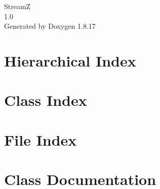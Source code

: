 \let\mypdfximage\pdfximage\def\pdfximage{\immediate\mypdfximage}\documentclass[twoside]{book}
\newcommand{\+}{\discretionary{\mbox{\scriptsize$\hookleftarrow$}}{}{}}
\newcommand{\clearemptydoublepage}{%
  \newpage{\pagestyle{empty}\cleardoublepage}%
}
\begin{document}
\hypersetup{pageanchor=false,
             bookmarksnumbered=true,
             pdfencoding=unicode
            }
\begin{titlepage}
\vspace*{7cm}
\begin{center}%
{\Large StreamZ \\[1ex]\large 1.\+0 }\\
\vspace*{1cm}
{\large Generated by Doxygen 1.8.17}\\
\end{center}
\end{titlepage}
\clearemptydoublepage
{}
\tableofcontents
\clearemptydoublepage
{}
\hypersetup{pageanchor=true}

\chapter{Hierarchical Index}

\chapter{Class Index}

\chapter{File Index}

\chapter{Class Documentation}











































\end{document}
